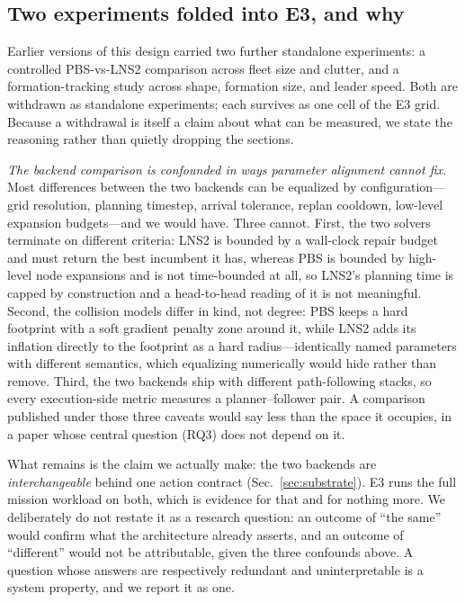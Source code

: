 \documentclass[10pt,twocolumn]{article}
\begin{document}
\subsection{Two experiments folded into E3, and why}
\label{sec:folded}

Earlier versions of this design carried two further standalone experiments: a
controlled PBS-vs-LNS2 comparison across fleet size and clutter, and a
formation-tracking study across shape, formation size, and leader speed. Both
are withdrawn as standalone experiments; each survives as one cell of the E3
grid. Because a withdrawal is itself a claim about what can be measured, we
state the reasoning rather than quietly dropping the sections.

\emph{The backend comparison is confounded in ways parameter alignment cannot
fix.} Most differences between the two backends can be equalized by
configuration---grid resolution, planning timestep, arrival tolerance, replan
cooldown, low-level expansion budgets---and we would have. Three cannot. First,
the two solvers terminate on different criteria: LNS2 is bounded by a wall-clock
repair budget and must return the best incumbent it has, whereas PBS is bounded
by high-level node expansions and is not time-bounded at all, so LNS2's planning
time is capped by construction and a head-to-head reading of it is not
meaningful. Second, the collision models differ in kind, not degree: PBS keeps a
hard footprint with a soft gradient penalty zone around it, while LNS2 adds its
inflation directly to the footprint as a hard radius---identically named
parameters with different semantics, which equalizing numerically would hide
rather than remove. Third, the two backends ship with different path-following
stacks, so every execution-side metric measures a planner--follower pair. A
comparison published under those three caveats would say less than the space it
occupies, in a paper whose central question (RQ3) does not depend on it.

What remains is the claim we actually make: the two backends are
\emph{interchangeable} behind one action contract (Sec.~\ref{sec:substrate}).
E3 runs the full mission workload on both, which is evidence for that and for
nothing more. We deliberately do not restate it as a research question: an
outcome of ``the same'' would confirm what the architecture already asserts,
and an outcome of ``different'' would not be attributable, given the three
confounds above. A question whose answers are respectively redundant and
uninterpretable is a system property, and we report it as one.
\end{document}
